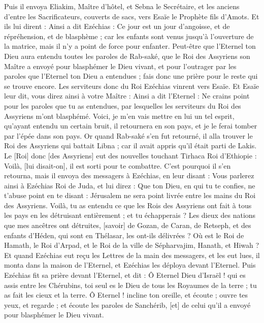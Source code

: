 \begin{multicols}{2}
Puis il envoya Eliakim, Maître d'hôtel, et Sebna le Secrétaire, et les anciens d'entre les Sacrificateurs, couverts de sacs, vers Esaïe le Prophète fils d'Amots.
Et ils lui dirent : Ainsi a dit Ezéchias : Ce jour est un jour d'angoisse, et de répréhension, et de blasphème ; car les enfants sont venus jusqu'à l'ouverture de la matrice, mais il n'y a point de force pour enfanter.
Peut-être que l'Eternel ton Dieu aura entendu toutes les paroles de Rab-saké, que le Roi des Assyriens son Maître a envoyé pour blasphémer le Dieu vivant, et pour l'outrager par les paroles que l'Eternel ton Dieu a entendues ; fais donc une prière pour le reste qui se trouve encore.
Les serviteurs donc du Roi Ezéchias vinrent vers Esaïe.
Et Esaïe leur dit, vous direz ainsi à votre Maître : Ainsi a dit l'Eternel : Ne crains point pour les paroles que tu as entendues, par lesquelles les serviteurs du Roi des Assyriens m'ont blasphémé.
Voici, je m'en vais mettre en lui un tel esprit, qu'ayant entendu un certain bruit, il retournera en son pays, et je le ferai tomber par l'épée dans son pays.
Or quand Rab-saké s'en fut retourné, il alla trouver le Roi des Assyriens qui battait Libna ; car il avait appris qu'il était parti de Lakis.
Le [Roi] donc [des Assyriens] eut des nouvelles touchant Tirhaca Roi d'Ethiopie : Voilà, [lui disait-on], il est sorti pour te combattre. C'est pourquoi il s'en retourna, mais il envoya des messagers à Ezéchias, en leur disant :
Vous parlerez ainsi à Ezéchias Roi de Juda, et lui direz : Que ton Dieu, en qui tu te confies, ne t'abuse point en te disant : Jérusalem ne sera point livrée entre les mains du Roi des Assyriens.
Voilà, tu as entendu ce que les Rois des Assyriens ont fait à tous les pays en les détruisant entièrement ; et tu échapperais ?
Les dieux des nations que mes ancêtres ont détruites, [savoir] de Gozan, de Caran, de Retseph, et des enfants d'Héden, qui sont en Thélasar, les ont-ils délivrées ?
Où est le Roi de Hamath, le Roi d'Arpad, et le Roi de la ville de Sépharvajim, Hanath, et Hiwah ?
Et quand Ezéchias eut reçu les Lettres de la main des messagers, et les eut lues, il monta dans la maison de l'Eternel, et Ezéchias les déploya devant l'Eternel.
Puis Ezéchias fit sa prière devant l'Eternel, et dit : Ô Eternel Dieu d'Israël ! qui es assis entre les Chérubins, toi seul es le Dieu de tous les Royaumes de la terre ; tu as fait les cieux et la terre.
Ô Eternel ! incline ton oreille, et écoute ; ouvre tes yeux, et regarde ; et écoute les paroles de Sanchérib, [et] de celui qu'il a envoyé pour blasphémer le Dieu vivant.

\end{multicols}
